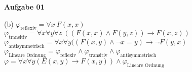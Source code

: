 \documentclass[a4paper,10pt]{article}
\begin{document}
	\parindent0pt
	\textbf{Aufgabe 01}
	\begin{compactenum}
		\item [(b)] $\varphi_{\text{reflexiv}} = \forall x \ F(x,x)$\\
		$\varphi_{\text{transitiv}} = \forall x \forall y \forall z \ ((F(x,x) \wedge F(y,z)) \rightarrow F(x,z))$\\
		$\varphi_{\text{antisymmetrisch}} = \forall x \forall y ((F(x,y) \wedge \neg x = y) \rightarrow \neg F(y,x) $\\
		$\varphi_{\text{Lineare Ordnung}} = \varphi_{\text{reflexiv}} \wedge \varphi_{\text{transitiv}} \wedge \varphi_{\text{antisymmetrisch}}$\\
		$\varphi = \forall x \forall y (E(x,y) \rightarrow F(x,y)) \wedge \varphi_{\text{Lineare Ordnung}}$
	\end{compactenum} \ \\
	
\end{document}
